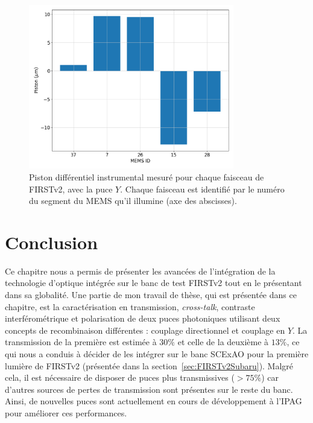 \begin{figure}[ht!]
    \centering
    \includegraphics[width=0.8\textwidth]{Figure_Chap2/20221010_FullOnData_FiberPiston_Pola1_LaTex.png}
    \caption[Piston différentiel instrumental mesuré pour chaque faisceau de FIRSTv2, avec la puce $Y$.]{Piston différentiel instrumental mesuré pour chaque faisceau de FIRSTv2, avec la puce $Y$. Chaque faisceau est identifié par le numéro du segment du MEMS qu'il illumine (axe des abscisses).}
    \label{fig:FiberPiston}
\end{figure}


\section{Conclusion}

Ce chapitre nous a permis de présenter les avancées de l'intégration de la technologie d'optique intégrée sur le banc de test \ac{FIRSTv2} tout en le présentant dans sa globalité. Une partie de mon travail de thèse, qui est présentée dans ce chapitre, est la caractérisation en transmission, \textit{cross-talk}, contraste interférométrique et polarisation de deux puces photoniques utilisant deux concepts de recombinaison différentes : couplage directionnel et couplage en $Y$. La transmission de la première est estimée à $30\%$ et celle de la deuxième à $13\%$, ce qui nous a conduis à décider de les intégrer sur le banc \ac{SCExAO} pour la première lumière de \ac{FIRSTv2} (présentée dans la section~\ref{sec:FIRSTv2Subaru}). Malgré cela, il est nécessaire de disposer de puces plus transmissives ($> 75\%$) car d'autres sources de pertes de transmission sont présentes sur le reste du banc. Ainsi, de nouvelles puces sont actuellement en cours de développement à l'\ac{IPAG} pour améliorer ces performances.

